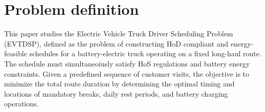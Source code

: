 \documentclass[3p,11pt,authoryear]{elsarticle}  %
\begin{document}
\section{Problem definition}

This paper studies the Electric Vehicle Truck Driver Scheduling Problem (EVTDSP), defined as the problem of constructing HoD compliant and energy-feasible schedules for a battery-electric truck operating on a fixed long-haul route. The schedule must simultaneoiusly satisfy HoS regulations and battery energy constraints. Given a predefined sequence of customer visits, the objective is to minimize the total route duration by determining the optimal timing and locations of mandatory breaks, daily rest periods, and battery charging operations.

\begin{figure}[htbp]
\centering
{}
\end{figure}
\end{document}
